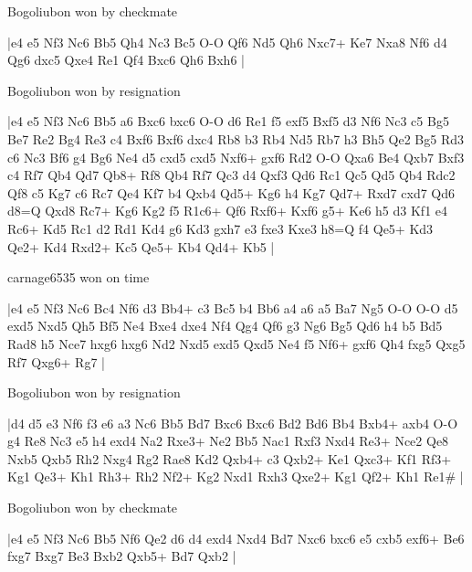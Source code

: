 \showboard

Bogoliubon won by checkmate

\makegametitle
|e4 e5 Nf3 Nc6 Bb5 Qh4 Nc3 Bc5 O-O Qf6 Nd5 Qh6 Nxc7+ Ke7 Nxa8 Nf6 d4 Qg6 dxc5 Qxe4 Re1 Qf4 Bxc6 Qh6 Bxh6  |

\showboard

Bogoliubon won by resignation

\makegametitle
|e4 e5 Nf3 Nc6 Bb5 a6 Bxc6 bxc6 O-O d6 Re1 f5 exf5 Bxf5 d3 Nf6 Nc3 c5 Bg5 Be7 Re2 Bg4 Re3 c4 Bxf6 Bxf6 dxc4 Rb8 b3 Rb4 Nd5 Rb7 h3 Bh5 Qe2 Bg5 Rd3 c6 Nc3 Bf6 g4 Bg6 Ne4 d5 cxd5 cxd5 Nxf6+ gxf6 Rd2 O-O Qxa6 Be4 Qxb7 Bxf3 c4 Rf7 Qb4 Qd7 Qb8+ Rf8 Qb4 Rf7 Qc3 d4 Qxf3 Qd6 Rc1 Qc5 Qd5 Qb4 Rdc2 Qf8 c5 Kg7 c6 Rc7 Qe4 Kf7 b4 Qxb4 Qd5+ Kg6 h4 Kg7 Qd7+ Rxd7 cxd7 Qd6 d8=Q Qxd8 Rc7+ Kg6 Kg2 f5 R1c6+ Qf6 Rxf6+ Kxf6 g5+ Ke6 h5 d3 Kf1 e4 Rc6+ Kd5 Rc1 d2 Rd1 Kd4 g6 Kd3 gxh7 e3 fxe3 Kxe3 h8=Q f4 Qe5+ Kd3 Qe2+ Kd4 Rxd2+ Kc5 Qe5+ Kb4 Qd4+ Kb5  |

\showboard

carnage6535 won on time

\makegametitle
|e4 e5 Nf3 Nc6 Bc4 Nf6 d3 Bb4+ c3 Bc5 b4 Bb6 a4 a6 a5 Ba7 Ng5 O-O O-O d5 exd5 Nxd5 Qh5 Bf5 Ne4 Bxe4 dxe4 Nf4 Qg4 Qf6 g3 Ng6 Bg5 Qd6 h4 b5 Bd5 Rad8 h5 Nce7 hxg6 hxg6 Nd2 Nxd5 exd5 Qxd5 Ne4 f5 Nf6+ gxf6 Qh4 fxg5 Qxg5 Rf7 Qxg6+ Rg7  |

\showboard

Bogoliubon won by resignation

\makegametitle
|d4 d5 e3 Nf6 f3 e6 a3 Nc6 Bb5 Bd7 Bxc6 Bxc6 Bd2 Bd6 Bb4 Bxb4+ axb4 O-O g4 Re8 Nc3 e5 h4 exd4 Na2 Rxe3+ Ne2 Bb5 Nac1 Rxf3 Nxd4 Re3+ Nce2 Qe8 Nxb5 Qxb5 Rh2 Nxg4 Rg2 Rae8 Kd2 Qxb4+ c3 Qxb2+ Ke1 Qxc3+ Kf1 Rf3+ Kg1 Qe3+ Kh1 Rh3+ Rh2 Nf2+ Kg2 Nxd1 Rxh3 Qxe2+ Kg1 Qf2+ Kh1 Re1\#  |

\showboard

Bogoliubon won by checkmate

\makegametitle
|e4 e5 Nf3 Nc6 Bb5 Nf6 Qe2 d6 d4 exd4 Nxd4 Bd7 Nxc6 bxc6 e5 cxb5 exf6+ Be6 fxg7 Bxg7 Be3 Bxb2 Qxb5+ Bd7 Qxb2  |

\showboard


